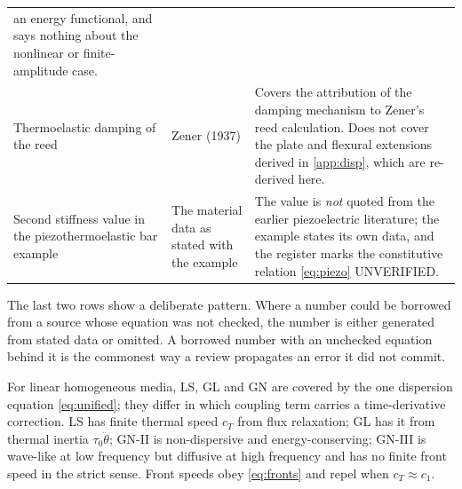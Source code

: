 \begin{table}[H]
\begin{tabularx}{\textwidth}{@{}p{3.1cm}Y Y@{}}
  an energy functional, and says nothing about the nonlinear or finite-amplitude case. \\
Thermoelastic damping of the reed & Zener (1937) &
  Covers the attribution of the damping mechanism to Zener's reed calculation. Does not cover the
  plate and flexural extensions derived in \cref{app:disp}, which are re-derived here. \\
Second stiffness value in the piezothermoelastic bar example & The material data as stated with the
  example & The value is \emph{not} quoted from the earlier piezoelectric literature; the example states
  its own data, and the register marks the constitutive relation \eqref{eq:piezo} UNVERIFIED. \\
\bottomrule
\end{tabularx}
\end{table}

The last two rows show a deliberate pattern. Where a number could be borrowed from a source whose
equation was not checked, the number is either generated from stated data or omitted. A borrowed
number with an unchecked equation behind it is the commonest way a review propagates an error it did not
commit.

\begin{summarybox}[Summary]
For linear homogeneous media, LS, GL and GN are covered by the one dispersion equation \eqref{eq:unified}; they differ in which coupling term carries a time-derivative correction. LS has finite thermal speed $c_T$ from flux relaxation; GL has it from thermal inertia $\tau_0\ddot\theta$; GN-II is non-dispersive and energy-conserving; GN-III is wave-like at low frequency but diffusive at high frequency and has no finite front speed in the strict sense. Front speeds obey \eqref{eq:fronts} and repel when $c_T\approx c_1$.
\end{summarybox}
